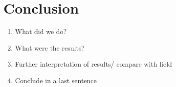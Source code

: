 \chapter{Conclusion}

\begin{enumerate}
    \item What did we do?
    \item What were the results?
    \item Further interpretation of results/ compare with field
    \item Conclude in a last sentence
\end{enumerate}


